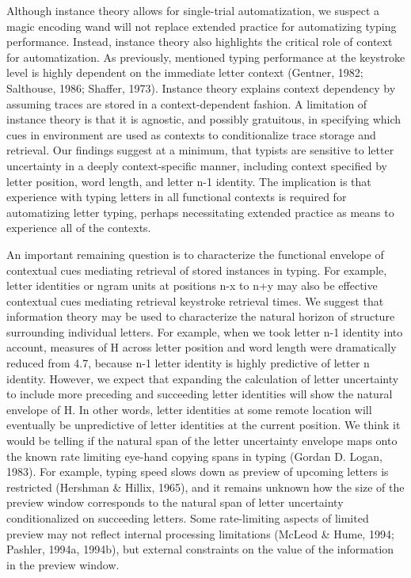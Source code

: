 \documentclass[floatsintext,man]{apa6}
\theoremstyle{definition}
\theoremstyle{definition}
\theoremstyle{definition}
\theoremstyle{remark}
\begin{document}
Although instance theory allows for single-trial automatization, we
suspect a magic encoding wand will not replace extended practice for
automatizing typing performance. Instead, instance theory also
highlights the critical role of context for automatization. As
previously, mentioned typing performance at the keystroke level is
highly dependent on the immediate letter context (Gentner, 1982;
Salthouse, 1986; Shaffer, 1973). Instance theory explains context
dependency by assuming traces are stored in a context-dependent fashion.
A limitation of instance theory is that it is agnostic, and possibly
gratuitous, in specifying which cues in environment are used as contexts
to conditionalize trace storage and retrieval. Our findings suggest at a
minimum, that typists are sensitive to letter uncertainty in a deeply
context-specific manner, including context specified by letter position,
word length, and letter n-1 identity. The implication is that experience
with typing letters in all functional contexts is required for
automatizing letter typing, perhaps necessitating extended practice as
means to experience all of the contexts.

An important remaining question is to characterize the functional
envelope of contextual cues mediating retrieval of stored instances in
typing. For example, letter identities or ngram units at positions n-x
to n+y may also be effective contextual cues mediating retrieval
keystroke retrieval times. We suggest that information theory may be
used to characterize the natural horizon of structure surrounding
individual letters. For example, when we took letter n-1 identity into
account, measures of H across letter position and word length were
dramatically reduced from 4.7, because n-1 letter identity is highly
predictive of letter n identity. However, we expect that expanding the
calculation of letter uncertainty to include more preceding and
succeeding letter identities will show the natural envelope of H. In
other words, letter identities at some remote location will eventually
be unpredictive of letter identities at the current position. We think
it would be telling if the natural span of the letter uncertainty
envelope maps onto the known rate limiting eye-hand copying spans in
typing (Gordan D. Logan, 1983). For example, typing speed slows down as
preview of upcoming letters is restricted (Hershman \& Hillix, 1965),
and it remains unknown how the size of the preview window corresponds to
the natural span of letter uncertainty conditionalized on succeeding
letters. Some rate-limiting aspects of limited preview may not reflect
internal processing limitations (McLeod \& Hume, 1994; Pashler, 1994a,
1994b), but external constraints on the value of the information in the
preview window.
\end{document}
